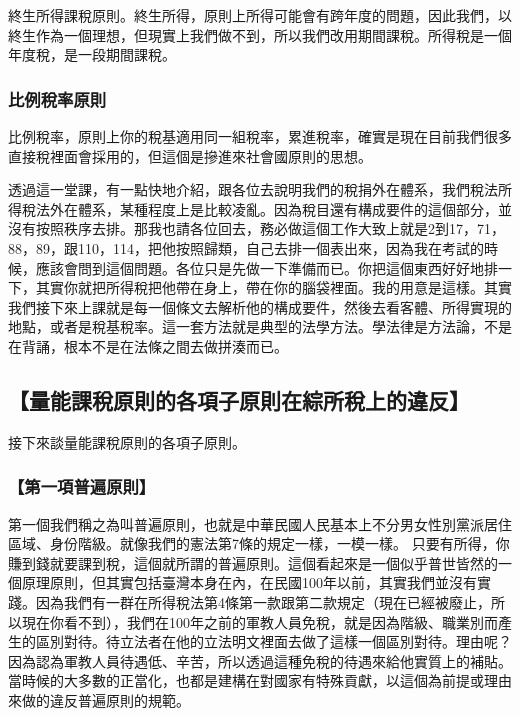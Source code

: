 \documentclass[oneside,sub3section]{ctexbook}
\begin{document}
終生所得課稅原則。終生所得，原則上所得可能會有跨年度的問題，因此我們，以終生作為一個理想，但現實上我們做不到，所以我們改用期間課稅。所得稅是一個年度稅，是一段期間課稅。

\hypertarget{ux6bd4ux4f8bux7a05ux7387ux539fux5247}{%
\subsubsection{比例稅率原則}\label{ux6bd4ux4f8bux7a05ux7387ux539fux5247}}

比例稅率，原則上你的稅基適用同一組稅率，累進稅率，確實是現在目前我們很多直接稅裡面會採用的，但這個是摻進來社會國原則的思想。

透過這一堂課，有一點快地介紹，跟各位去說明我們的稅捐外在體系，我們稅法所得稅法外在體系，某種程度上是比較凌亂。因為稅目還有構成要件的這個部分，並沒有按照秩序去排。那我也請各位回去，務必做這個工作大致上就是2到17，71，88，89，跟110，114，把他按照歸類，自己去排一個表出來，因為我在考試的時候，應該會問到這個問題。各位只是先做一下準備而已。你把這個東西好好地排一下，其實你就把所得稅把他帶在身上，帶在你的腦袋裡面。我的用意是這樣。其實我們接下來上課就是每一個條文去解析他的構成要件，然後去看客體、所得實現的地點，或者是稅基稅率。這一套方法就是典型的法學方法。學法律是方法論，不是在背誦，根本不是在法條之間去做拼湊而已。

\hypertarget{ux91cfux80fdux8ab2ux7a05ux539fux5247ux7684ux5404ux9805ux5b50ux539fux5247ux5728ux7d9cux6240ux7a05ux4e0aux7684ux9055ux53cd}{%
\subsection{【量能課稅原則的各項子原則在綜所稅上的違反】}\label{ux91cfux80fdux8ab2ux7a05ux539fux5247ux7684ux5404ux9805ux5b50ux539fux5247ux5728ux7d9cux6240ux7a05ux4e0aux7684ux9055ux53cd}}

接下來談量能課稅原則的各項子原則。

\hypertarget{ux7b2cux4e00ux9805ux666eux904dux539fux5247}{%
\subsubsection{【第一項普遍原則】}\label{ux7b2cux4e00ux9805ux666eux904dux539fux5247}}

第一個我們稱之為叫普遍原則，也就是中華民國人民基本上不分男女性別黨派居住區域、身份階級。就像我們的憲法第7條的規定一樣，一模一樣。
只要有所得，你賺到錢就要課到稅，這個就所謂的普遍原則。這個看起來是一個似乎普世皆然的一個原理原則，但其實包括臺灣本身在內，在民國100年以前，其實我們並沒有實踐。因為我們有一群在所得稅法第4條第一款跟第二款規定（現在已經被廢止，所以現在你看不到），我們在100年之前的軍教人員免稅，就是因為階級、職業別而產生的區別對待。待立法者在他的立法明文裡面去做了這樣一個區別對待。理由呢？因為認為軍教人員待遇低、辛苦，所以透過這種免稅的待遇來給他實質上的補貼。當時候的大多數的正當化，也都是建構在對國家有特殊貢獻，以這個為前提或理由來做的違反普遍原則的規範。
\end{document}
